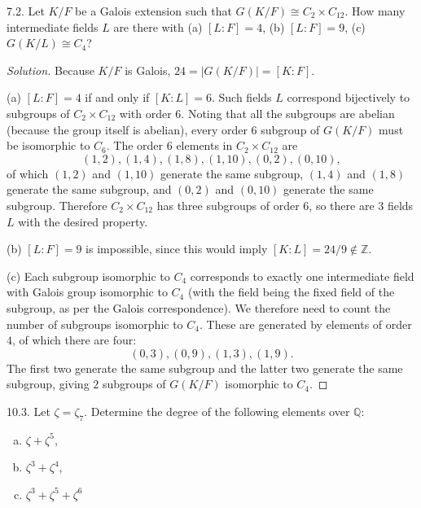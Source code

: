 \documentclass[10pt]{scrartcl}
\providecommand{\QQ}{\mathbb Q}
\providecommand{\ZZ}{\mathbb Z}
\providecommand{\ii}{\item}
\newenvironment{soln}{\begin{proof}[Solution]}{\end{proof}}
\begin{document}
\begin{problem*}7.2.
	Let $K/F$ be a Galois extension such that $G(K/F)\cong C_2\times C_{12}$.
	How many intermediate fields $L$ are there with
	(a) $[L:F] = 4$, (b) $[L:F] = 9$, (c) $G(K/L)\cong C_4$?
\end{problem*}

\begin{soln}
	Because $K/F$ is Galois, $24 = |G(K/F)| = [K:F]$.
	
	(a) $[L:F]=4$ if and only if $[K:L] = 6$.
	Such fields $L$ correspond bijectively to subgroups of $C_2\times C_{12}$
	with order $6$. Noting that all the subgroups are abelian
	(because the group itself is abelian), every order $6$ subgroup
	of $G(K/F)$ must be isomorphic to $C_6$. The order $6$ elements
	in $C_2\times C_{12}$ are
	\[(1, 2), (1, 4), (1, 8), (1, 10), (0, 2), (0, 10),\]
	of which $(1, 2)$ and $(1, 10)$ generate the same subgroup,
	$(1, 4)$ and $(1, 8)$ generate the same subgroup,
	and $(0, 2)$ and $(0,10)$ generate the same subgroup.
	Therefore $C_2\times C_{12}$ has three subgroups of order $6$,
	so there are $\boxed 3$ fields $L$ with the desired property.
	
	(b) $[L:F]=9$ is impossible, since this would imply $[K:L] = 24/9\notin\ZZ$.
	
	(c) Each subgroup isomorphic to $C_4$ corresponds to
	exactly one intermediate field with Galois group isomorphic to $C_4$
	(with the field being the fixed field of the subgroup,
	as per the Galois correspondence).
	We therefore need to count the number of subgroups isomorphic to $C_4$.
	These are generated by elements of order $4$,
	of which there are four:
	\[(0,3), (0, 9), (1, 3), (1, 9).\]
	The first two generate the same subgroup and the latter two
	generate the same subgroup, giving $\boxed{2}$ subgroups of $G(K/F)$
	isomorphic to $C_4$.
\end{soln}

\pagebreak
\begin{problem*}10.3.
	Let $\zeta = \zeta_7$. Determine the degree of
	the following elements over $\QQ$:
	\begin{enumerate}[(a)]
		\ii $\zeta + \zeta^5$,
		\ii $\zeta^3 + \zeta^4$,
		\ii $\zeta^3+\zeta^5+\zeta^6$
	\end{enumerate}
\end{problem*}
\end{document}

